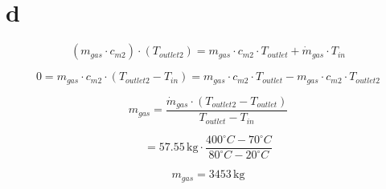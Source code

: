 

\section*{d}
\begin{equation*}
(m_{gas} \cdot c_{m2}) \cdot (T_{outlet2}) = m_{gas} \cdot c_{m2} \cdot T_{outlet} + \dot{m}_{gas} \cdot T_{in}
\end{equation*}

\begin{equation*}
0 = m_{gas} \cdot c_{m2} \cdot (T_{outlet2} - T_{in}) = m_{gas} \cdot c_{m2} \cdot T_{outlet} - m_{gas} \cdot c_{m2} \cdot T_{outlet2}
\end{equation*}

\begin{equation*}
m_{gas} = \frac{\dot{m}_{gas} \cdot (T_{outlet2} - T_{outlet})}{T_{outlet} - T_{in}}
\end{equation*}

\begin{equation*}
= 57.55 \, \text{kg} \cdot \frac{400^\circ C - 70^\circ C}{80^\circ C - 20^\circ C}
\end{equation*}

\begin{equation*}
m_{gas} = 3453 \, \text{kg}
\end{equation*}